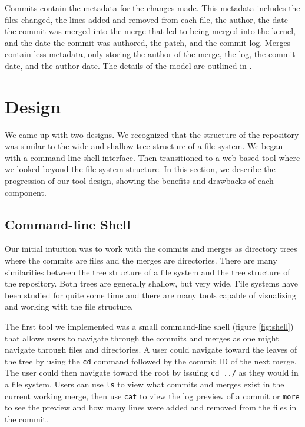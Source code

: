 \documentclass[conference, draftclsnofoot, draft]{IEEEtran}
\begin{document}
Commits contain the
metadata for the changes made. This metadata includes the files changed, the lines
added and removed from each file, the author, the date the commit was merged into
the merge that led to being merged into the kernel, and the date the commit was
authored, the patch, and the commit log. Merges contain less metadata, only storing
the author of the merge, the log, the commit date, and the author date. The details
of the model are outlined in \cite{German2015}.

\section{Design}



We came up with two designs. We recognized that the structure of the repository was
similar to the wide and shallow tree-structure of a file system. We began with a
command-line shell interface. Then transitioned to a web-based tool where we looked
beyond the file system structure. In this section, we describe the progression of
our tool design, showing the benefits and drawbacks of each component.

\subsection{Command-line Shell}

Our initial intuition was to work with the commits and merges as directory trees
where the commits are files and the merges are directories. There are many
similarities between the tree structure of a file system and the tree structure of
the repository. Both trees are generally shallow, but very wide. File systems have
been studied for quite some time and there are many tools capable of visualizing and
working with the file structure.

The first tool we implemented was a small command-line shell (figure
\ref{fig:shell}) that allows users to navigate through the commits and merges as one
might navigate through files and directories. A user could navigate toward the
leaves of the tree by using the \verb|cd| command followed by the commit ID of the
next merge. The user could then navigate toward the root by issuing \verb|cd ../|
as they would in a file system. Users can use \verb|ls| to view what commits and
merges exist in the current working merge, then use \verb|cat| to view the log
preview of a commit or \verb|more| to see the preview and how many lines were added
and removed from the files in the commit.
\end{document}
